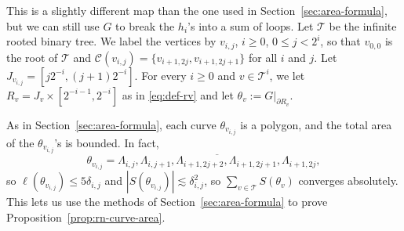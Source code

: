 \documentclass[12pt,reqno]{amsart}
\newcommand{\cC}{\mathcal{C}}
\newcommand{\cT}{\mathcal{T}}
\theoremstyle{remark}
\newcommand{\0}{\mathbf{0}}
\renewcommand{\1}{\mathbf 1}
\begin{document}
This is a slightly different map than the one used in Section~\ref{sec:area-formula}, but we can still use $G$ to break the $h_i$'s into a sum of loops. Let $\cT$ be the infinite rooted binary tree. We label the vertices by $v_{i,j}$, $i\ge 0$, $0\le j < 2^i$, so that $v_{0,0}$ is the root of $\cT$ and $\cC(v_{i,j}) = \{v_{i+1,2j},v_{i+1,2j+1}\}$ for all $i$ and $j$. Let $J_{v_{i,j}} = [j2^{-i}, (j+1)2^{-i}]$. For every $i\ge 0$ and $v\in \cT^i$, we let $R_v=J_v\times [2^{-i-1}, 2^{-i}]$ as in \eqref{eq:def-rv} and let $\theta_v := G|_{\partial R_v}$.

As in Section~\ref{sec:area-formula}, each curve $\theta_{v_{i,j}}$ is a polygon, and the total area of the $\theta_{v_{i,j}}$'s is bounded. In fact, 
$$\theta_{v_{i,j}} = \overline{\Lambda_{i,j},\Lambda_{i,j+1}, \Lambda_{i+1,2j+2}, \Lambda_{i+1,2j+1}, \Lambda_{i+1,2j}},$$
so $\ell(\theta_{v_{i,j}}) \le 5 \delta_{i,j}$ and $|S(\theta_{v_{i,j}})| \lesssim \delta_{i,j}^2$, so $\sum_{v\in \cT} S(\theta_v)$ converges absolutely. This lets us use the methods of Section~\ref{sec:area-formula} to prove Proposition~\ref{prop:rn-curve-area}.
\end{document}
